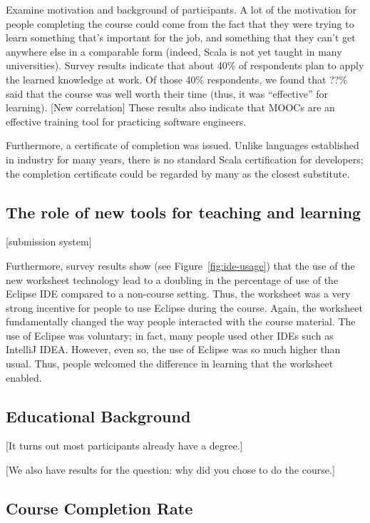 \documentclass{sig-alternate}
\begin{document}
Examine motivation and background of participants. A lot of the motivation for
people completing the course could come from the fact that they were trying to
learn something that's important for the job, and something that they can't
get anywhere else in a comparable form (indeed, Scala is not yet taught in
many universities). Survey results indicate that about 40\% of respondents
plan to apply the learned knowledge at work. Of those 40\% respondents, we
found that ??\% said that the course was well worth their time (thus, it was
``effective'' for learning). [New correlation] These results also indicate
that MOOCs are an effective training tool for practicing software engineers.

Furthermore, a certificate of completion was issued. Unlike languages
established in industry for many years, there is no standard Scala
certification for developers; the completion certificate could be regarded by
many as the closest substitute.

\subsection{The role of new tools for teaching and learning}

[submission system]

Furthermore, survey results show (see Figure~\ref{fig:ide-usage}) that the use
of the new worksheet technology lead to a doubling in the percentage of use of
the Eclipse IDE compared to a non-course setting. Thus, the worksheet was a
very strong incentive for people to use Eclipse during the course. Again, the
worksheet fundamentally changed the way people interacted with the course
material. The use of Eclipse was voluntary; in fact, many people used other
IDEs such as IntelliJ IDEA. However, even so, the use of Eclipse was so much
higher than usual. Thus, people welcomed the difference in learning that the
worksheet enabled.

\subsection{Educational Background}

[It turns out most participants already have a degree.]

[We also have results for the question: why did you chose to do the course.]

\subsection{Course Completion Rate}
\end{document}
